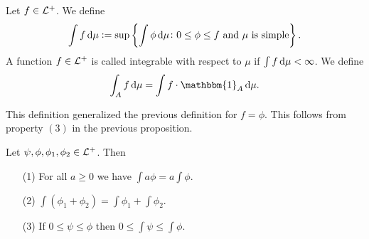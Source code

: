 \documentclass[11pt,a4paper]{article}
\begin{document}
\begin{definition}[Integrability]
  Let $f \in \mathcal{L}^+$.
  We define
  \[
    \int f \dmu :=
    \sup\set{\int \phi \dmu \colon 0 \le \phi \le f \stand \mu 
    \text{ is simple}}.
  \]
  A function $f \in \mathcal{L}^+$ is called integrable with respect to $\mu$ if
  $\int f \dmu < \infty$.
  We define
  \[
    \int_{A} f \dmu = \int f \cdot \mathbbm{1}_{A} \dmu.
  \]
\end{definition}
\begin{remark}
  This definition generalized the previous definition for $f = \phi$.
  This follows from property $(3)$ in the previous proposition.
\end{remark}

\begin{proposition}
  Let $\psi, \phi, \phi_1, \phi_2 \in \mathcal{L}^+$.
  Then
  \begin{enumerate}
    \item[(1)] For all $a \geq 0$ we have $\int a \phi = a \int \phi$.
    \item[(2)] $\int (\phi_1 + \phi_2) = \int \phi_1 + \int \phi_2$.
    \item[(3)] If $0 \le \psi \le \phi$ then $0 \le \int \psi \le \int \phi$.
  \end{enumerate}
\end{proposition}
\end{document}
